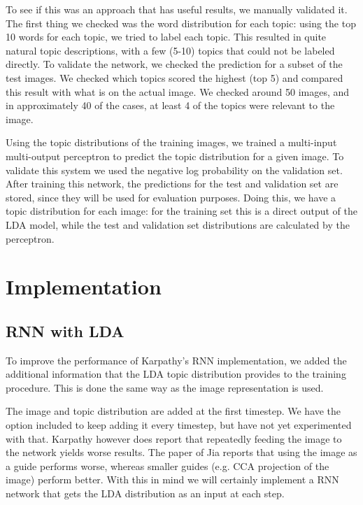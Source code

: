 \documentclass{article}
\begin{document}
To see if this was an approach that has useful results, we manually validated it. The first thing we checked was the word distribution for each topic: using the top 10 words for each topic, we tried to label each topic. This resulted in quite natural topic descriptions, with a few (5-10) topics that could not be labeled directly. To validate the network, we checked the prediction for a subset of the test images. We checked which topics scored the highest (top 5) and compared this result with what is on the actual image. We checked around 50 images, and in approximately 40 of the cases, at least 4 of the topics were relevant to the image. 

Using the topic distributions of the training images, we trained a multi-input multi-output perceptron to predict the topic distribution for a given image. To validate this system we used the negative log probability on the validation set. After training this network, the predictions for the test and validation set are stored, since they will be used for evaluation purposes. Doing this, we have a topic distribution for each image: for the training set this is a direct output of the LDA model, while the test and validation set distributions are calculated by the perceptron. 

\section{Implementation}
\subsection{RNN with LDA}
To improve the performance of Karpathy's RNN implementation, we added the additional information that the LDA topic distribution provides to the training procedure. This is done the same way as the image representation is used. 

The image and topic distribution are added at the first timestep. We have the option included to keep adding it every timestep, but have not yet experimented with that. Karpathy however does report that repeatedly feeding the image to the network yields worse results. The paper of Jia reports that using the image as a guide performs worse, whereas smaller guides (e.g. CCA projection of the image) perform better. With this in mind we will certainly implement a RNN network that gets the LDA distribution as an input at each step.
\end{document}
